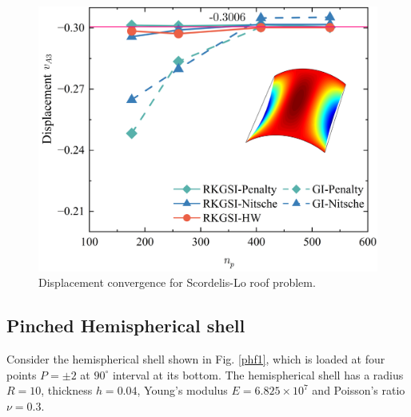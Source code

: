 \begin{figure}[!ht]
\centering
\includegraphics[width=\textwidth]{figures/sld_r2}
\caption{Displacement convergence for Scordelis-Lo roof problem.}\label{slf4}
\end{figure}

\subsection{Pinched Hemispherical shell}
Consider the hemispherical shell shown in Fig. \ref{phf1}, which is loaded at four points $P=\pm 2$ at $90^\circ$ interval at its bottom. The hemispherical shell has a radius $R=10$, thickness $h=0.04$, Young's modulus $E=6.825\times10^7$ and Poisson's ratio $\nu = 0.3$.

